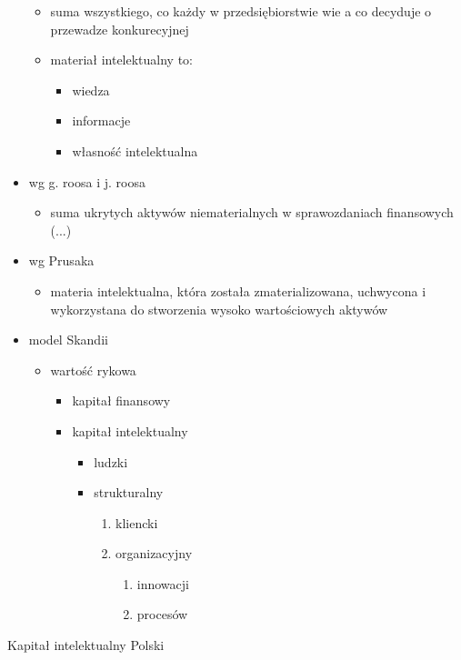\documentclass[a4paper,10pt]{report}
\begin{document}
\begin{itemize}
\begin{itemize}
		\item suma wszystkiego, co każdy w przedsiębiorstwie wie a co decyduje o przewadze konkurecyjnej
		\item materiał intelektualny to:
		\begin{itemize}
			\item wiedza
			\item informacje
			\item własność intelektualna
		\end{itemize}
	\end{itemize}
	\item wg g. roosa i j. roosa
	\begin{itemize}
		\item suma ukrytych aktywów niematerialnych w sprawozdaniach finansowych (...)
	\end{itemize}
	\item wg Prusaka
	\begin{itemize}
		\item materia intelektualna, która została zmaterializowana, uchwycona i wykorzystana do stworzenia wysoko wartościowych aktywów
	\end{itemize}
	\item model Skandii
	\begin{itemize}
		\item wartość rykowa
		\begin{itemize}
			\item kapitał finansowy
			\item kapitał intelektualny
			\begin{itemize}
				\item ludzki
				\item strukturalny
				\begin{enumerate}
					\item kliencki
					\item organizacyjny
					\begin{enumerate}
						\item innowacji
						\item procesów					
					\end{enumerate}
				\end{enumerate}
			\end{itemize}
		\end{itemize}
	\end{itemize}
\end{itemize}

\noindent Kapitał intelektualny Polski
\end{document}
